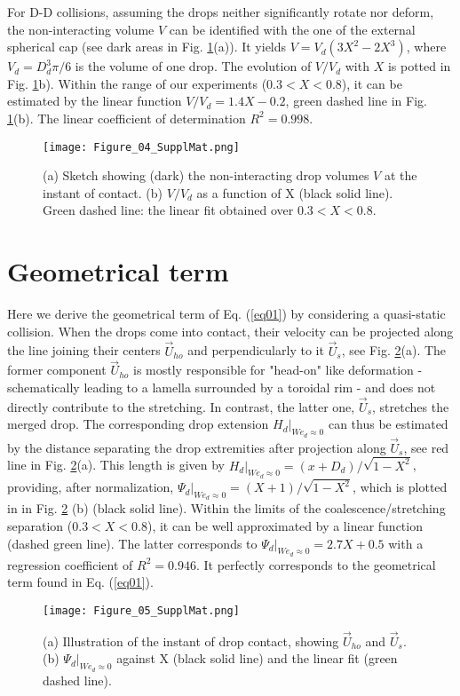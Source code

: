 \documentclass{article}
\begin{document}
For D-D collisions, assuming the drops neither significantly rotate nor deform, the non-interacting volume $V$ can be identified with the one of the external spherical cap (see dark areas in Fig. \ref{app_fig04}(a)). It yields $V=V_{d}(3X^2-2X^3)$, where $V_{d}=D_d^3\pi/6$ is the volume of one drop. The evolution of $V/V_{d}$ with $X$ is potted in Fig. \ref{app_fig04}b).  Within the range of our experiments ($0.3<X<0.8$), it can be estimated by the linear function $V/V_{d}=1.4X-0.2$,  green dashed line in Fig. \ref{app_fig04}(b).  The linear coefficient of determination $R^2=0.998$.
\begin{figure}
\centering
\texttt{[image: Figure\_04\_SupplMat.png]}
\caption{\label{app_fig04} (a) Sketch showing (dark) the non-interacting drop volumes $V$ at the instant of contact. (b) $V/V_d$ as a function of X (black solid line). Green dashed line: the linear fit obtained over $0.3<X<0.8$.}
\end{figure}

\section{Geometrical term} \label{appE}

Here we derive the geometrical term of Eq. (\ref{eq01}) by considering a quasi-static collision. When the drops come into contact, their velocity can be projected along the line  joining their centers $\vec{U}_{ho}$ and perpendicularly to it $\vec{U}_{s}$, see Fig. \ref{app_fig05}(a). The former component $\vec{U}_{ho}$ is mostly responsible for "head-on" like deformation  - schematically leading to a lamella surrounded by a toroidal rim - and does not directly contribute to the stretching. In contrast, the latter one, $\vec{U}_{s}$, stretches the merged drop. The corresponding drop extension $H_d|_{We_d\approx0}$ can thus be estimated by the distance separating the drop extremities after projection along $\vec{U}_{s}$, see red line in Fig. \ref{app_fig05}(a). This length is given by $H_d|_{We_d\approx0}=(x+D_d)/\sqrt{1-X^2}$, providing, after normalization, $\Psi_d|_{We_d\approx0}= (X+1)/\sqrt{1-X^2}$, which is plotted in in Fig. \ref{app_fig05} (b) (black solid line).  Within the limits of the coalescence/stretching separation ($0.3<X<0.8$), it can be well approximated by a linear function (dashed green line). The latter corresponds to  $\Psi_d|_{We_d\approx0} = 2.7 X + 0.5$ with a regression coefficient of $R^2=0.946$. It perfectly corresponds to the geometrical term found in Eq. (\ref{eq01}).
\begin{figure}
\centering
\texttt{[image: Figure\_05\_SupplMat.png]}
\caption{\label{app_fig05} (a) Illustration of the instant of drop contact, showing $\vec{U}_{ho}$ and $\vec{U}_{s}$. (b) $\Psi_d|_{We_d\approx0}$ against X (black solid line) and the linear fit (green dashed line).}
\end{figure}
\end{document}
